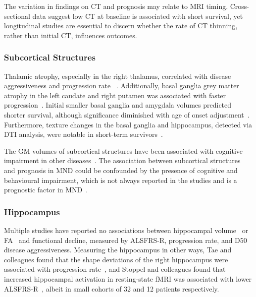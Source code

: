 The variation in findings on CT and prognosis may relate to MRI timing.
Cross-sectional data suggest low CT at baseline is associated with short survival, yet longitudinal studies are essential to discern whether the rate of CT thinning, rather than initial CT, influences outcomes.

\subsubsection*{Subcortical Structures}

Thalamic atrophy, especially in the right thalamus, correlated with disease aggressiveness and progression rate ~\cite{dieckmannCorticalSubcorticalGrey2022, johnsQuantifyingChangesSusceptibility2019}.
Additionally, basal ganglia grey matter atrophy in the left caudate and right putamen was associated with faster progression~\cite{sendaStructuralMRICorrelates2017, agostaLongitudinalAssessmentGrey2009}.
Initial smaller basal ganglia and amygdala volumes predicted shorter survival, although significance diminished with age of onset adjustment~\cite{westenengSubcorticalStructuresAmyotrophic2015}.
Furthermore, texture changes in the basal ganglia and hippocampus, detected via DTI analysis, were notable in short-term survivors~\cite{ishaqueEvaluatingCerebralCorrelates2018}.

The GM volumes of subcortical structures have been associated with cognitive impairment in other diseases~\cite{yiRelationSubcorticalGrey2016}.
The association between subcortical structures and prognosis in MND could be confounded by the presence of cognitive and behavioural impairment, which is not always reported in the studies and is a prognostic factor in MND~\cite{suPredictorsSurvivalPatients2021}.

\subsubsection*{Hippocampus}
Multiple studies have reported no associations between hippocampal volume~\cite{abdullaHippocampalDegenerationPatients2014, dieckmannCorticalSubcorticalGrey2022} or FA~\cite{mullerLargescaleMulticentreCerebral2016} and functional decline, measured by ALSFRS-R, progression rate, and D50 disease aggressiveness.
Measuring the hippocampus in other ways, Tae and colleagues found that the shape deviations of the right hippocampus were associated with progression rate~\cite{taeShapeAnalysisSubcortical2020}, and Stoppel and colleagues found that increased hippocampal activation in resting-state fMRI was associated with lower ALSFRS-R~\cite{stoppelStructuralFunctionalHallmarks2014}, albeit in small cohorts of 32 and 12 patients respectively.

